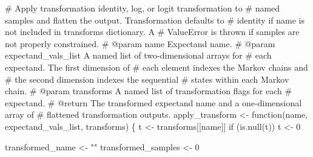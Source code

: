 \documentclass[
  letterpaper,
  DIV=11,
  numbers=noendperiod]{scrartcl}
\newenvironment{Shaded}{\begin{snugshade}}{\end{snugshade}}
\newcommand{\CommentTok}[1]{\textcolor[rgb]{0.37,0.37,0.37}{#1}}
\newcommand{\ControlFlowTok}[1]{\textcolor[rgb]{0.00,0.23,0.31}{#1}}
\newcommand{\DecValTok}[1]{\textcolor[rgb]{0.68,0.00,0.00}{#1}}
\newcommand{\KeywordTok}[1]{\textcolor[rgb]{0.00,0.23,0.31}{#1}}
\newcommand{\NormalTok}[1]{\textcolor[rgb]{0.00,0.23,0.31}{#1}}
\newcommand{\OperatorTok}[1]{\textcolor[rgb]{0.37,0.37,0.37}{#1}}
\newcommand{\StringTok}[1]{\textcolor[rgb]{0.13,0.47,0.30}{#1}}
\begin{document}
\begin{Shaded}
\begin{Highlighting}[]
\CommentTok{\# Apply transformation identity, log, or logit transformation to}
\CommentTok{\# named samples and flatten the output.  Transformation defaults to }
\CommentTok{\# identity if name is not included in \textasciigrave{}transforms\textasciigrave{} dictionary.  A }
\CommentTok{\# ValueError is thrown if samples are not properly constrained.}
\CommentTok{\# @param name Expectand name.}
\CommentTok{\# @param expectand\_vals\_list A named list of two{-}dimensional arrays for}
\CommentTok{\#                            each expectand.  The first dimension of}
\CommentTok{\#                            each element indexes the Markov chains and}
\CommentTok{\#                            the second dimension indexes the sequential}
\CommentTok{\#                            states within each Markov chain.}
\CommentTok{\# @param transforms A named list of transformation flags for each }
\CommentTok{\#                   expectand.}
\CommentTok{\# @return The transformed expectand name and a one{-}dimensional array of}
\CommentTok{\#         flattened transformation outputs.}
\NormalTok{apply\_transform }\OperatorTok{\textless{}{-}}\NormalTok{ function(name, expectand\_vals\_list, transforms) \{}
\NormalTok{  t }\OperatorTok{\textless{}{-}}\NormalTok{ transforms[[name]]}
  \ControlFlowTok{if}\NormalTok{ (}\KeywordTok{is}\NormalTok{.null(t)) t }\OperatorTok{\textless{}{-}} \DecValTok{0}
  
\NormalTok{  transformed\_name }\OperatorTok{\textless{}{-}} \StringTok{""}
\NormalTok{  transformed\_samples }\OperatorTok{\textless{}{-}} \DecValTok{0}
 

\end{Highlighting}
\end{Shaded}
\end{document}
